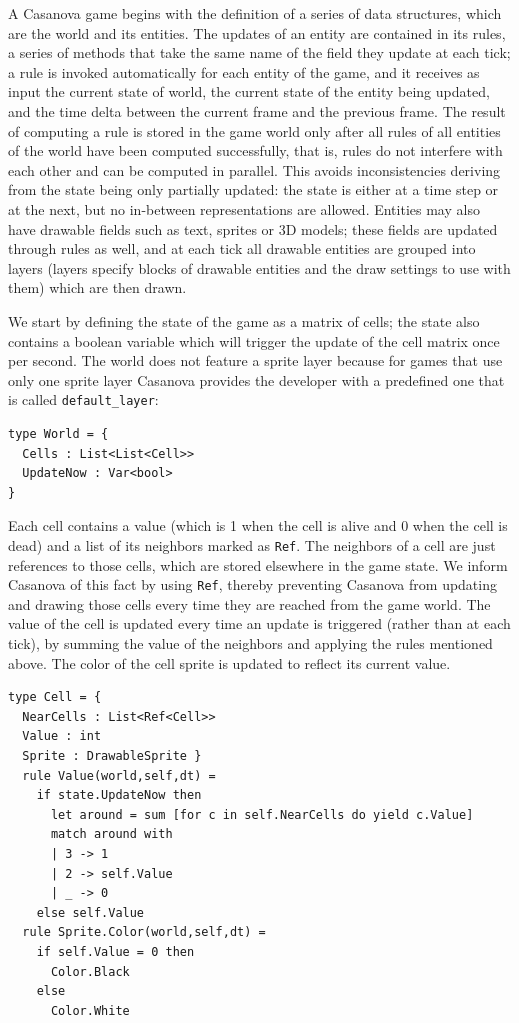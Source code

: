 A Casanova game begins with the definition of a series of data structures, which are the world and its entities. The updates of an entity are contained in its rules, a series of methods that take the same name of the field they update at each tick; a rule is invoked automatically for each entity of the game, and it receives as input the current state of world, the current state of the entity being updated, and the time delta between the current frame and the previous frame. The result of computing a rule is stored in the game world only after all rules of all entities of the world have been computed successfully, that is, rules do not interfere with each other and can be computed in parallel. This avoids inconsistencies deriving from the state being only partially updated: the state is either at a time step or at the next, but no in-between representations are allowed. Entities may also have drawable fields such as text, sprites or 3D models; these fields are updated through rules as well, and at each tick all drawable entities are grouped into layers (layers specify blocks of drawable entities and the draw settings to use with them) which are then drawn. 

We start by defining the state of the game as a matrix of cells; the state also contains a boolean variable which will trigger the update of the cell matrix once per second. The world does not feature a sprite layer because for games that use only one sprite layer Casanova provides the developer with a predefined one that is called \texttt{default\_layer}:

\begin{lstlisting}
type World = { 
  Cells : List<List<Cell>> 
  UpdateNow : Var<bool> 
}
\end{lstlisting}

Each cell contains a value (which is 1 when the cell is alive and 0 when the cell is dead) and a list of its neighbors marked as \texttt{Ref}. The neighbors of a cell are just references to those cells, which are stored elsewhere in the game state. We inform Casanova of this fact by using \texttt{Ref}, thereby preventing Casanova from updating and drawing those cells every time they are reached from the game world. The value of the cell is updated every time an update is triggered (rather than at each tick), by summing the value of the neighbors and applying the rules mentioned above. The color of the cell sprite is updated to reflect its current value. 

\begin{lstlisting}
type Cell = { 
  NearCells : List<Ref<Cell>> 
  Value : int 
  Sprite : DrawableSprite }
  rule Value(world,self,dt) = 
    if state.UpdateNow then 
      let around = sum [for c in self.NearCells do yield c.Value] 
      match around with 
      | 3 -> 1 
      | 2 -> self.Value 
      | _ -> 0 
    else self.Value 
  rule Sprite.Color(world,self,dt) = 
    if self.Value = 0 then 
      Color.Black 
    else 
      Color.White
\end{lstlisting}

